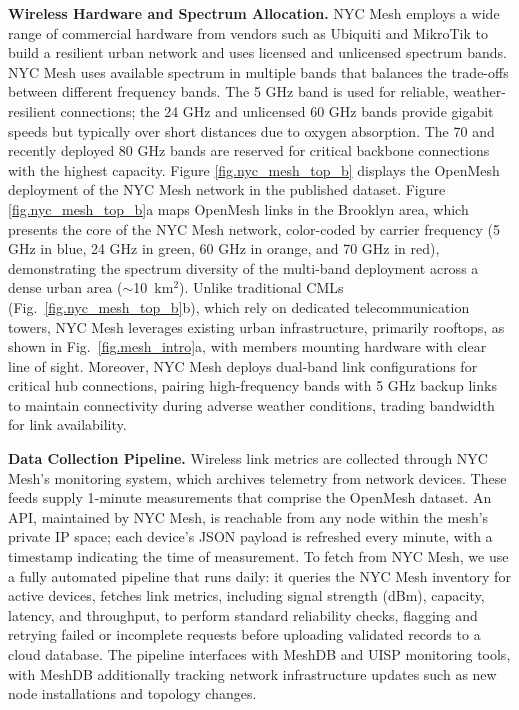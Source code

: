 \documentclass[manuscript]{copernicus}
\begin{document}
\noindent \textbf{Wireless Hardware and Spectrum Allocation.}
NYC Mesh employs a wide range of commercial hardware from vendors such as Ubiquiti and MikroTik to build a resilient urban network and uses licensed and unlicensed spectrum bands.
NYC Mesh uses available spectrum in multiple bands that balances the trade-offs between different frequency bands.
The 5 GHz band is used for reliable, weather-resilient connections; the 24 GHz and unlicensed 60 GHz bands provide gigabit speeds but typically over short distances due to oxygen absorption. The 70 and recently deployed 80 GHz bands are reserved for critical backbone connections with the highest capacity.
Figure \ref{fig.nyc_mesh_top_b} displays the OpenMesh deployment of the NYC Mesh network in the published dataset. 
Figure \ref{fig.nyc_mesh_top_b}a maps OpenMesh links in the Brooklyn area, which presents the core of the NYC Mesh network, color-coded by carrier frequency (5 GHz in blue, 24 GHz in green, 60 GHz in orange, and 70 GHz in red), demonstrating the spectrum diversity of the multi-band deployment across a dense urban area ($\sim$10~km$^2$).
Unlike traditional CMLs (Fig.~\ref{fig.nyc_mesh_top_b}b), which rely on dedicated telecommunication towers, NYC Mesh leverages existing urban infrastructure, primarily rooftops, as shown in Fig.~\ref{fig.mesh_intro}a, with members mounting hardware with clear line of sight.
Moreover, NYC Mesh deploys dual-band link configurations for critical hub connections, pairing high-frequency bands with 5 GHz backup links to maintain connectivity during adverse weather conditions, trading bandwidth for link availability.



\noindent \textbf{Data Collection Pipeline.}\label{sec:network-hardware}
Wireless link metrics are collected through NYC Mesh's monitoring system, which archives telemetry from network devices. These feeds supply 1‑minute measurements that comprise the OpenMesh dataset.
An API, maintained by NYC Mesh, is reachable from any node within the mesh's private IP space; each device's JSON payload is refreshed every minute, with a timestamp indicating the time of measurement.
To fetch from NYC Mesh, we use a fully automated pipeline that runs daily: it queries the NYC Mesh inventory for active devices, fetches link metrics, including signal strength (dBm), capacity, latency, and throughput, to perform standard reliability checks, flagging and retrying failed or incomplete requests before uploading validated records to a cloud database.
The pipeline interfaces with MeshDB and UISP monitoring tools, with MeshDB additionally tracking network infrastructure updates such as new node installations and topology changes.
\end{document}
